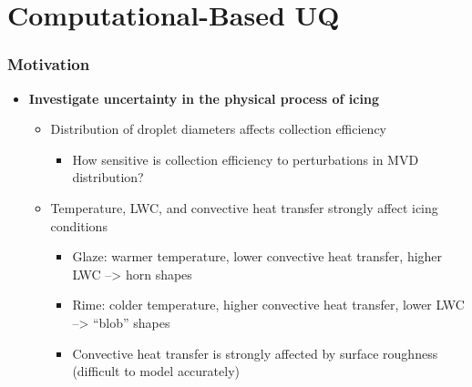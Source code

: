 \documentclass[9pt]{beamer}
\begin{document}
\section{Computational-Based UQ}
\label{sec-5}
\begin{frame}
\frametitle{Motivation}
\label{sec-5-1}

\begin{itemize}
\item \textbf{Investigate uncertainty in the physical process of icing}
\begin{itemize}
\item Distribution of droplet diameters affects collection efficiency
\begin{itemize}
\item How sensitive is collection efficiency to perturbations in MVD distribution?
\end{itemize}
\item Temperature, LWC, and convective heat transfer strongly affect icing conditions
\begin{itemize}
\item Glaze: warmer temperature, lower convective heat transfer, higher LWC --> horn shapes
\item Rime: colder temperature, higher convective heat transfer, lower LWC --> ``blob'' shapes
\item Convective heat transfer is strongly affected by surface roughness (difficult to model accurately)
\end{itemize}
\end{itemize}
\end{itemize}
\end{frame}
\end{document}
